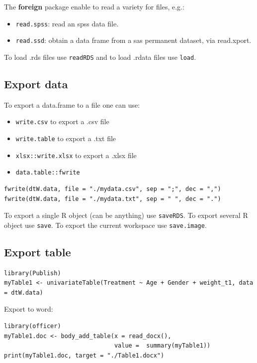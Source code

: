 \documentclass{article}
\begin{document}
\bigskip

The \textbf{foreign} package enable to read a variety for files, e.g.:
\begin{itemize}
\item \texttt{read.spss}: read an spss data file.
\item \texttt{read.ssd}: obtain a data frame from a sas permanent dataset, via read.xport.
\end{itemize}

\bigskip

To load .rds files use \texttt{readRDS} and to load .rdata files use \texttt{load}.

\subsection{Export data}
\label{sec:org828dc25}

To export a data.frame to a file one can use:
\begin{itemize}
\item \texttt{write.csv} to export a .csv file
\item \texttt{write.table} to export a .txt file
\item \texttt{xlsx::write.xlsx} to export a .xlsx file
\item \texttt{data.table::fwrite}
\end{itemize}
\lstset{language=r,label= ,caption= ,captionpos=b,numbers=none}
\begin{lstlisting}
fwrite(dtW.data, file = "./mydata.csv", sep = ";", dec = ",")
fwrite(dtW.data, file = "./mydata.txt", sep = " ", dec = ".")
\end{lstlisting}

To export a single R object (can be anything) use \texttt{saveRDS}.
To export several R object use \texttt{save}.
To export the current workspace use \texttt{save.image}.

\subsection{Export table}
\label{sec:orgefa38c2}

\lstset{language=r,label= ,caption= ,captionpos=b,numbers=none}
\begin{lstlisting}
library(Publish)
myTable1 <- univariateTable(Treatment ~ Age + Gender + weight_t1, data = dtW.data)
\end{lstlisting}

Export to word:
\lstset{language=r,label= ,caption= ,captionpos=b,numbers=none}
\begin{lstlisting}
library(officer)
myTable1.doc <- body_add_table(x = read_docx(), 
							   value =  summary(myTable1)) 
print(myTable1.doc, target = "./Table1.docx")
\end{lstlisting}
\end{document}
